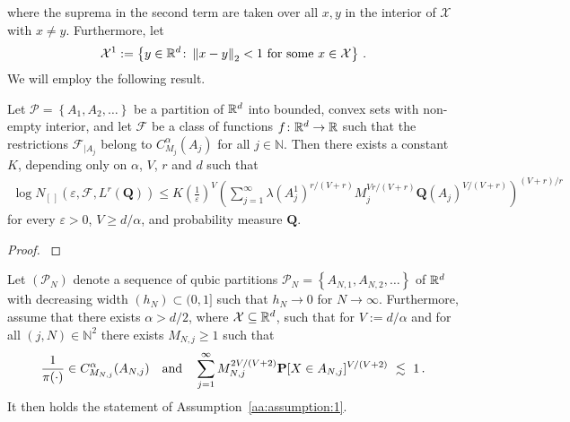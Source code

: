 where the suprema in the second term are taken over all $x,y$ in the interior of $\mathcal{X}$ with $x\neq y$.
Furthermore, let
\begin{gather*}
  \mathcal{X}^1
  :=
  \left\{ 
    y\in\R^d
    \colon
    \norm{x-y}_2 <1
    \ 
    \text{for some}\ x\in\mathcal{X}
  \right\}
  \,.
\end{gather*}
We will employ the following result.
\begin{lemma}
  Let $\mathcal{P}=\left\{ A_1,A_2,\ldots \right\}$ be a partition of $\mathbb{R}^d$ into bounded, convex sets with non-empty interior, and let $\mathcal{F}$ be a class of functions $f\colon\mathbb{R}^d\to\mathbb{R}$ such that the restrictions $\mathcal{F}_{|A_j}$ belong to $C^\alpha_{M_j}(A_j)$
  for all $j\in\mathbb{N}$.
  Then there exists a constant $K$, depending only on $\alpha$, $V$, $r$ and $d$
  such that
  \begin{gather*}
    \log
    N_{[\,]}
    (
    \varepsilon
    ,
    \mathcal{F}
    ,
    L^r(\mathbf{Q})
    )
    \le
    K
    \left( \frac{1}{\varepsilon} \right)^V
    \left( 
      \sum_{j=1}^{\infty}
      \lambda(A_j^1)^{r/(V+r)}
      M_j^{Vr/(V+r)}
      \mathbf{Q}(A_j)^{V/(V+r)}
    \right)
    ^{(V+r)/r}
  \end{gather*}
  for every $\varepsilon>0$, $V\ge d/\alpha$, and probability measure $\mathbf{Q}$.
\end{lemma}
\begin{proof}
  \emph{\cite[Corollary~2.7.4]{vaart2013}}
\end{proof}
\pagebreak
\begin{lemma}
  Let $(\mathcal{P}_N)$ denote a sequence of qubic partitions
  $\mathcal{P}_N=\left\{ A_{N,1},A_{N,2},\ldots \right\}$ 
  of $\mathbb{R}^d$ 
  with decreasing width $(h_N)\subset(0,1]$ such that $h_N\to 0$ for $N\to\infty$.
  Furthermore, assume that there exists
  $\alpha>d/2$, where $\mathcal{X}\subseteq \mathbb{R}^d$, such
  that for 
  $V:=d/\alpha$
 and for all 
$
(j,N)\in\mathbb{N}^2
$
there exists 
$M_{N,j}\ge 1$ such that 
\begin{gather*}
  \frac{1}{\pi(\cdot)}
  \in C^\alpha_{M_{N,j}}(A_{N,j})
  \quad
  \text{and}
  \quad
  \sum_{j=1}^{\infty} 
  M_{N,j}^{2V/(V+2)}
  \P
  [
  X\in A_{N,j}
  ]^{V/(V+2)}
  \ 
  \lesssim
  \ 
  1
  \,.
\end{gather*}
It then holds the statement of Assumption~\ref{aa:assumption:1}.
\end{lemma}
